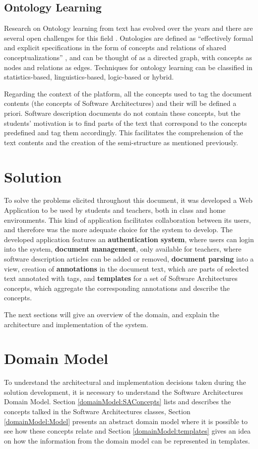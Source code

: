 \documentclass{llncs}
\begin{document}
\subsection{Ontology Learning}
Research on Ontology learning from text has evolved over the years and there are several open challenges for this field \cite{wong2012ontology}. Ontologies are defined as ``effectively formal and explicit specifications in the form of concepts and relations of shared conceptualizations'' \cite{gruber1993translation}, and can be thought of as a directed graph, with concepts as nodes and relations as edges. Techniques for ontology learning can be classified in statistics-based, linguistics-based, logic-based or hybrid.

Regarding the context of the platform, all the concepts used to tag the document contents (the concepts of Software Architectures) and their will be defined a priori. Software description documents do not contain these concepts, but the students' motivation is to find parts of the text that correspond to the concepts predefined and tag them accordingly. This facilitates the comprehension of the text contents and the creation of the semi-structure as mentioned previously.

\section{Solution}
\label{solution}
To solve the problems elicited throughout this document, it was developed a Web Application to be used by students and teachers, both in class and home environments. This kind of application facilitates collaboration between its users, and therefore was the more adequate choice for the system to develop. The developed application features an \textbf{authentication system}, where users can login into the system, \textbf{document management}, only available for teachers, where software description articles can be added or removed, \textbf{document parsing } into a view, creation of \textbf{annotations} in the document text, which are parts of selected text annotated with tags, and \textbf{templates }for a set of Software Architectures concepts, which aggregate the corresponding annotations and describe the concepts.

The next sections will give an overview of the domain, and explain the architecture and implementation of the system.
\section{Domain Model}
\label{domainModel}
To understand the architectural and implementation decisions taken during the solution development, it is necessary to understand the Software Architectures Domain Model. Section \ref{domainModel:SAConcepts} lists and describes the concepts talked in the Software Architectures classes, Section \ref{domainModel:Model} presents an abstract domain model where it is possible to see how these concepts relate and Section \ref{domainModel:templates} gives an idea on how the information from the domain model can be represented in templates.
\end{document}
